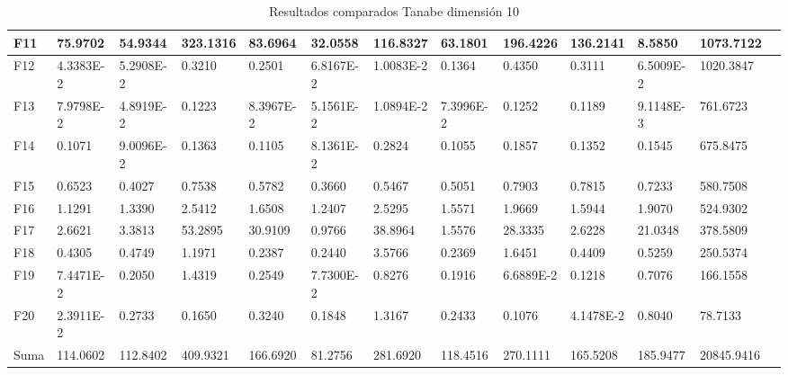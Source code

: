 \documentclass[12pt,a4paper]{article}
\begin{document}
\begin{table}[!h]
{\begin{tabular}{ | l | l | l | l | l | l | l | l | l | l | l | l | l | }
				F11 & 75.9702 & 54.9344 & 323.1316 & 83.6964 & 32.0558 & 116.8327 & 63.1801 & 196.4226 & 136.2141 & 8.5850 & 1073.7122 \\ \hline
				F12 & 4.3383E-2 & 5.2908E-2 & 0.3210 & 0.2501 & 6.8167E-2 & 1.0083E-2 & 0.1364 & 0.4350 & 0.3111 & 6.5009E-2 & 1020.3847 \\ \hline
				F13 & 7.9798E-2 & 4.8919E-2 & 0.1223 & 8.3967E-2 & 5.1561E-2 & 1.0894E-2 & 7.3996E-2 & 0.1252 & 0.1189 & 9.1148E-3 & 761.6723 \\ \hline
				F14 & 0.1071 & 9.0096E-2 & 0.1363 & 0.1105 & 8.1361E-2 & 0.2824 & 0.1055 & 0.1857 & 0.1352 & 0.1545 & 675.8475 \\ \hline
				F15 & 0.6523 & 0.4027 & 0.7538 & 0.5782 & 0.3660 & 0.5467 & 0.5051 & 0.7903 & 0.7815 & 0.7233 & 580.7508 \\ \hline
				F16 & 1.1291 & 1.3390 & 2.5412 & 1.6508 & 1.2407 & 2.5295 & 1.5571 & 1.9669 & 1.5944 & 1.9070 & 524.9302 \\ \hline
				F17 & 2.6621 & 3.3813 & 53.2895 & 30.9109 & 0.9766 & 38.8964 & 1.5576 & 28.3335 & 2.6228 & 21.0348 & 378.5809 \\ \hline
				F18 & 0.4305 & 0.4749 & 1.1971 & 0.2387 & 0.2440 & 3.5766 & 0.2369 & 1.6451 & 0.4409 & 0.5259 & 250.5374 \\ \hline
				F19 & 7.4471E-2 & 0.2050 & 1.4319 & 0.2549 & 7.7300E-2 & 0.8276 & 0.1916 & 6.6889E-2 & 0.1218 & 0.7076 & 166.1558 \\ \hline
				F20 & 2.3911E-2 & 0.2733 & 0.1650 & 0.3240 & 0.1848 & 1.3167 & 0.2433 & 0.1076 & 4.1478E-2 & 0.8040 & 78.7133 \\ \hline
				Suma & 114.0602 & 112.8402 & 409.9321 & 166.6920 & 81.2756 & 281.6920 & 118.4516 & 270.1111 & 165.5208 & 185.9477 & 20845.9416 \\ \hline
			\end{tabular}
		}
		\label{tablaTANABE-D10}
		\caption{Resultados comparados Tanabe dimensión 10}
	\end{table}
\end{document}
